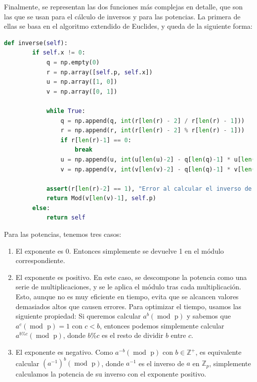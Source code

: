 Finalmente, se representan las dos funciones más complejas en detalle, que son las que se usan para el cálculo de inversos y para las potencias. La primera de ellas se basa en el algoritmo extendido de Euclides, y queda de la siguiente forma:
\begin{lstlisting}[language=Python, basicstyle=\footnotesize]
        def inverse(self):
        if self.x != 0:
            q = np.empty(0)
            r = np.array([self.p, self.x])
            u = np.array([1, 0])
            v = np.array([0, 1])

            while True:
                q = np.append(q, int(r[len(r) - 2] / r[len(r) - 1]))
                r = np.append(r, int(r[len(r) - 2] % r[len(r) - 1]))
                if r[len(r)-1] == 0:
                    break
                u = np.append(u, int(u[len(u)-2] - q[len(q)-1] * u[len(u)-1]))
                v = np.append(v, int(v[len(v)-2] - q[len(q)-1] * v[len(v)-1]))

            assert(r[len(r)-2] == 1), "Error al calcular el inverso de {}".format(self)
            return Mod(v[len(v)-1], self.p)
        else:
            return self
\end{lstlisting}

Para las potencias, tenemos tres casos:
\begin{enumerate}
    \item El exponente es 0. Entonces simplemente se devuelve 1 en el módulo correspondiente.

    \item El exponente es positivo. En este caso, se descompone la potencia como una serie de multiplicaciones, y se le aplica el módulo tras cada multiplicación. Esto, aunque no es muy eficiente en tiempo, evita que se alcancen valores demasiados altos que causen errores. Para optimizar el tiempo, usamos las siguiente propiedad: Si queremos calcular $a^{b} (\operatorname{mod} \text{ p})$ y sabemos que $a^{c} (\operatorname{mod} \text{ p}) = 1$ con $c < b$, entonces podemos simplemente calcular $a^{b \% c} (\operatorname{mod} \text{ p})$, donde $b \% c$ es el resto de dividir $b$ entre $c$.

    \item El exponente es negativo. Como $a^{-b} (\operatorname{mod} \text{ p})$ con $b \in \mathbb{Z}^{+}$, es equivalente calcular $(a^{-1})^{b} (\operatorname{mod} \text{ p})$, donde $a^{-1}$ es el inverso de $a$ en $\mathbb{Z}_{p}$, simplemente calculamos la potencia de su inverso con el exponente positivo.
\end{enumerate}

